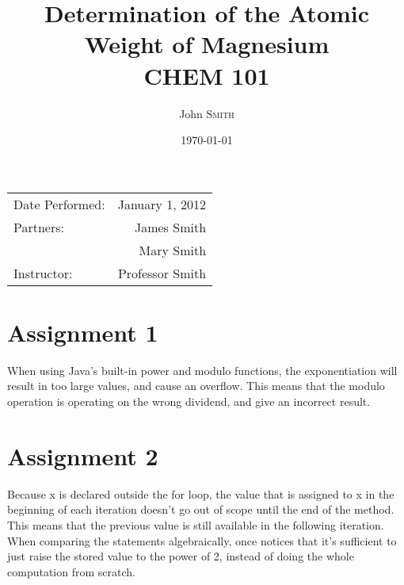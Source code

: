\documentclass{article}
\title{Determination of the Atomic \\ Weight of Magnesium \\ CHEM 101} %
\author{John \textsc{Smith}} %
\date{\today} %
\begin{document}
\maketitle %

\begin{center}
\begin{tabular}{l r}
Date Performed: & January 1, 2012 \\ %
Partners: & James Smith \\ %
& Mary Smith \\
Instructor: & Professor Smith %
\end{tabular}
\end{center}



\section{Assignment 1}

When using Java's built-in power and modulo functions, the exponentiation will result in too large values, and cause an overflow. This means that the modulo operation is operating on the wrong dividend, and give an incorrect result.
 

\section{Assignment 2}

Because x is declared outside the for loop, the value that is assigned to x in the beginning of each iteration doesn't go out of scope until the end of the method. This means that the previous value is still available in the following iteration. When comparing the statements algebraically, once notices that it's sufficient to just raise the stored value to the power of 2, instead of doing the whole computation from scratch.
\end{document}
